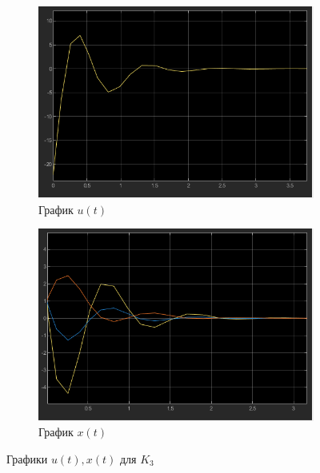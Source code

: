 \documentclass[a4paper, 12pt]{article}
\begin{document}
    \begin{figure}[H]
        \centering
        \begin{subfigure}{0.45\textwidth}
            \centering
            \includegraphics[width=\linewidth]{u_t_k3_task1.png}
            \caption{График $u(t)$}
            \label{fig:task_1_u_t_k3}
        \end{subfigure}
        \hfill
        \begin{subfigure}{0.45\textwidth}
            \centering
            \includegraphics[width=\linewidth]{x_t_k3_task1.png}
            \caption{График $x(t)$}
            \label{fig:task_1_x_t_k3}
        \end{subfigure}
        \caption{Графики $u(t),x(t)$ для $K_3$}
        \label{fig:task_1_modeling_3}
    \end{figure}
\end{document}
